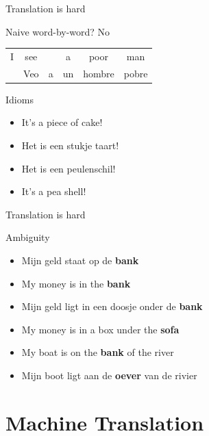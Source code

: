 \documentclass[compress]{beamer}
\begin{document}
\begin{frame}{Translation is hard}

	\begin{block}{Naive word-by-word? No}
		\begin{tabular}{cccccc}
			I & see &  & a & poor & man \\
			 & Veo & a & un & hombre & pobre \\
		\end{tabular}	
	\end{block}

	\begin{block}{Idioms}
		\begin{itemize}
			\item It's a piece of cake!
			\item Het is een stukje taart!
			\item Het is een peulenschil!
			\item It's a pea shell!
		\end{itemize}
	\end{block}
	
\end{frame}

\begin{frame}{Translation is hard}
	\begin{block}{Ambiguity}

		\begin{itemize}
			\item Mijn geld staat op de \textbf{bank} 
			\item My money is in the \textbf{bank}
		\end{itemize}

		\begin{itemize}
			\item Mijn geld ligt in een doosje onder de \textbf{bank}
			\item My money is in a box under the \textbf{sofa}
		\end{itemize}

		\begin{itemize}
			\item My boat is on the \textbf{bank} of the river
			\item Mijn boot ligt aan de \textbf{oever} van de rivier
		\end{itemize}	
	\end{block}
\end{frame}

\section{Machine Translation}
\end{document}
